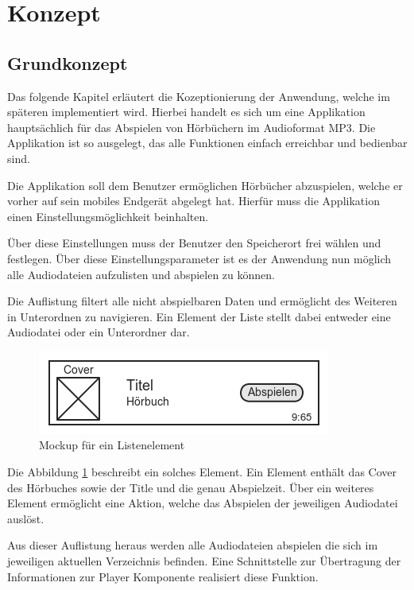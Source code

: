\section{Konzept}

\subsection{Grundkonzept}

Das folgende Kapitel erläutert die Kozeptionierung der Anwendung, welche im späteren implementiert wird. Hierbei handelt es sich um eine Applikation hauptsächlich für das Abspielen von Hörbüchern im Audioformat MP3. Die Applikation ist so ausgelegt, das alle Funktionen einfach erreichbar und bedienbar sind.

Die Applikation soll dem Benutzer ermöglichen Hörbücher abzuspielen, welche er vorher auf sein mobiles Endgerät abgelegt hat. Hierfür muss die Applikation einen Einstellungsmöglichkeit beinhalten.

Über diese Einstellungen muss der Benutzer den Speicherort frei wählen und festlegen. Über diese Einstellungsparameter ist es der Anwendung nun möglich alle Audiodateien aufzulisten und abspielen zu können.

Die Auflistung filtert alle nicht abspielbaren Daten und ermöglicht des Weiteren in Unterordnen zu navigieren. Ein Element der Liste stellt dabei entweder eine Audiodatei oder ein Unterordner dar. 

\begin{figure}
\begin{center}
\includegraphics[scale=0.8]{images/listitem}
\caption{Mockup für ein Listenelement}
\label{mocklistel}
\end{center}
\end{figure}

Die Abbildung \ref{mocklistel} beschreibt ein solches Element. Ein Element enthält das Cover des Hörbuches sowie der Title und die genau Abspielzeit. Über ein weiteres Element ermöglicht eine Aktion, welche das Abspielen der jeweiligen Audiodatei auslöst.

Aus dieser Auflistung heraus werden alle Audiodateien abspielen die sich im jeweiligen aktuellen Verzeichnis befinden. Eine Schnittstelle zur Übertragung der Informationen zur Player Komponente realisiert diese Funktion.

